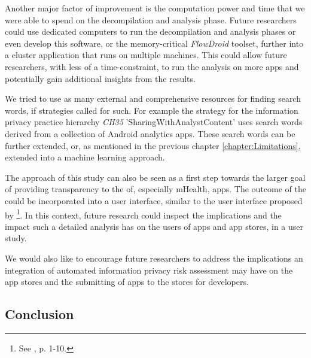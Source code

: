 Another major factor of improvement is the computation power and time that we were able to spend on the decompilation and analysis phase.
Future researchers could use dedicated computers to run the decompilation and analysis phases or even develop this software, or the memory-critical \textit{FlowDroid} toolset, further into a cluster application that runs on multiple machines.
This could allow future researchers, with less of a time-constraint, to run the analysis on more apps and potentially gain additional insights from the results.

We tried to use as many external and comprehensive resources for finding search words, if strategies called for such.
For example the strategy for the information privacy practice hierarchy \textit{CH35} 'SharingWithAnalystContent' uses search words derived from a collection of Android analytics apps.
These search words can be further extended, or, as mentioned in the previous chapter \ref{chapter:Limitations}, extended into a machine learning approach. 

The approach of this study can also be seen as a first step towards the larger goal of providing transparency to the \ipr of, especially mHealth, apps.
The outcome of the \aiprat could be incorporated into a user interface, similar to the user interface proposed by \textcite{Bruggemann2016}\footnote{See \cite{Bruggemann2016}, p. 1-10.}.
In this context, future research could inspect the implications and the impact such a detailed \ipr analysis has on the users of apps and app stores, in a user study.

We would also like to encourage future researchers to address the implications an integration of automated information privacy risk assessment may have on the app stores and the submitting of apps to the stores for developers.

\subsection{Conclusion}